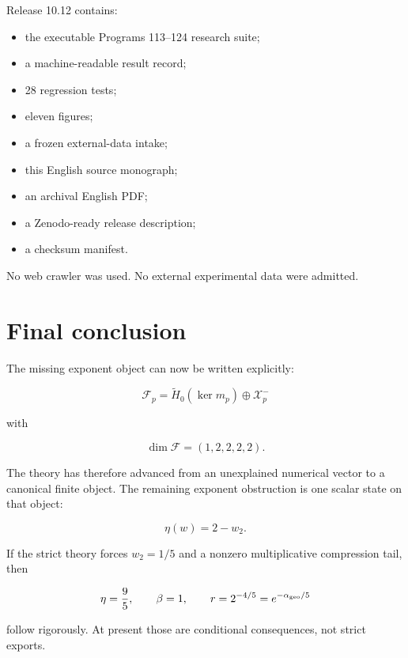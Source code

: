 \documentclass[11pt,a4paper,openany]{report}
\begin{document}
Release 10.12 contains:

\begin{itemize}
\item 
the executable Programs 113--124 research suite;

\item 
a machine-readable result record;

\item 
28 regression tests;

\item 
eleven figures;

\item 
a frozen external-data intake;

\item 
this English source monograph;

\item 
an archival English PDF;

\item 
a Zenodo-ready release description;

\item 
a checksum manifest.

\end{itemize}

No web crawler was used. No external experimental data were admitted.

\chapter{Final conclusion}

The missing exponent object can now be written explicitly:

\[
\boxed{
\mathcal F_p
=
\widetilde H_0(\ker m_p)
\oplus
\mathcal X_p^-
}
\]

with

\[
\dim\mathcal F=(1,2,2,2,2).
\]

The theory has therefore advanced from an unexplained numerical vector to a canonical finite object. The remaining exponent obstruction is one scalar state on that object:

\[
\eta(w)=2-w_2.
\]

If the strict theory forces \(w_2=1/5\) and a nonzero multiplicative compression tail, then

\[
\eta=\frac95,
\qquad
\beta=1,
\qquad
r=2^{-4/5}
=e^{-\alpha_{\rm geo}/5}
\]

follow rigorously. At present those are conditional consequences, not strict exports.
\end{document}
